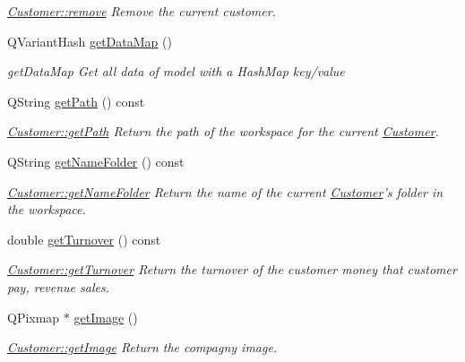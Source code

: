 \begin{DoxyCompactItemize}
\begin{DoxyCompactList}\small\item\em \hyperlink{classModels_1_1Customer_a0f5dba0d90af0adf5d0aca26195d21b1}{Customer\-::remove} Remove the current customer. \end{DoxyCompactList}\item 
Q\-Variant\-Hash \hyperlink{classModels_1_1Customer_ae72b05319056dc482f3f525ef40b8d40}{get\-Data\-Map} ()
\begin{DoxyCompactList}\small\item\em get\-Data\-Map Get all data of model with a Hash\-Map key/value \end{DoxyCompactList}\item 
Q\-String \hyperlink{classModels_1_1Customer_ac1aec0fb9058333e1a2496b1c29049af}{get\-Path} () const 
\begin{DoxyCompactList}\small\item\em \hyperlink{classModels_1_1Customer_ac1aec0fb9058333e1a2496b1c29049af}{Customer\-::get\-Path} Return the path of the workspace for the current \hyperlink{classModels_1_1Customer}{Customer}. \end{DoxyCompactList}\item 
Q\-String \hyperlink{classModels_1_1Customer_ab7c63946125a6b8d876f0f4e2b50c97e}{get\-Name\-Folder} () const 
\begin{DoxyCompactList}\small\item\em \hyperlink{classModels_1_1Customer_ab7c63946125a6b8d876f0f4e2b50c97e}{Customer\-::get\-Name\-Folder} Return the name of the current \hyperlink{classModels_1_1Customer}{Customer}'s folder in the workspace. \end{DoxyCompactList}\item 
double \hyperlink{classModels_1_1Customer_a193fb1920b53048d8a5f7c8e08581e69}{get\-Turnover} () const 
\begin{DoxyCompactList}\small\item\em \hyperlink{classModels_1_1Customer_a193fb1920b53048d8a5f7c8e08581e69}{Customer\-::get\-Turnover} Return the turnover of the customer money that customer pay, revenue sales. \end{DoxyCompactList}\item 
Q\-Pixmap $\ast$ \hyperlink{classModels_1_1Customer_ab7a4630fa60070dafb42031873c47251}{get\-Image} ()
\begin{DoxyCompactList}\small\item\em \hyperlink{classModels_1_1Customer_ab7a4630fa60070dafb42031873c47251}{Customer\-::get\-Image} Return the compagny image. \end{DoxyCompactList}\item 

\end{DoxyCompactItemize}
